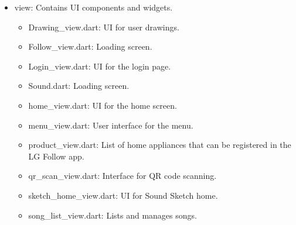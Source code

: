 \documentclass[conference]{IEEEtran}
\begin{document}
\begin{itemize}
\begin{itemize}
        \item view: Contains UI components and widgets.
        \begin{itemize}
            \item Drawing\_view.dart: UI for user drawings. \\
            \item Follow\_view.dart: Loading screen. \\
            \item Login\_view.dart: UI for the login page. \\
            \item Sound.dart: Loading screen.\\
            \item home\_view.dart: UI for the home screen. \\
            \item menu\_view.dart: User interface for the menu. \\
            \item product\_view.dart: List of home appliances that can be registered in the LG Follow app. 
            \item qr\_scan\_view.dart: Interface for QR code scanning. \\
            \item sketch\_home\_view.dart: UI for Sound Sketch home. \\
            \item song\_list\_view.dart: Lists and manages songs. \\
        \end{itemize}


\end{itemize}
\end{itemize}
\end{document}
